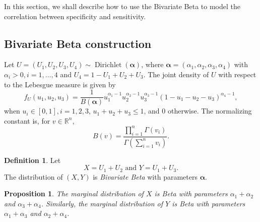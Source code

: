 \documentclass[a4paper, notitlepage, 11pt]{article}
\newcommand{\R}{\mathbb{R}}
\newtheorem{proposition}{Proposition}[]
\theoremstyle{definition}
\newtheorem{definition}{Definition}[section]
\theoremstyle{remark}
\begin{document}
In this section, we shall describe how to use the Bivariate Beta
\cite[]{olkin2015constructions} to model the correlation between specificity
and sensitivity.

\subsection{Bivariate Beta construction}

Let $U = (U_1, U_2, U_3, U_4) \sim
\operatorname{Dirichlet}(\boldsymbol{\alpha})$, where $\boldsymbol{\alpha} =
(\alpha_1, \alpha_2, \alpha_3, \alpha_4)$ with $\alpha_i > 0, i = 1,\dots,4$
and $U_4 = 1 - U_1 + U_2 + U_3$. The joint density of $U$ with respect to the
Lebesgue measure is given by
\begin{equation}
  f_U(u_1, u_2, u_3) = \frac{1}{B(\boldsymbol{\alpha})}u_1^{\alpha_1-1}u_2^{\alpha_2-1}u_3^{\alpha_3-1}(1-u_1-u_2-u_3)^{\alpha_4-1}, 
\end{equation}
when $u_i \in [0,1], i = 1,2,3$, $u_1 + u_2 + u_3 \le 1$, and $0$ otherwise.
The normalizing constant is, for $v \in \R^n$,
$$B(v) = \frac{\prod_{i=1}^n \Gamma(v_i)}{\Gamma\left(\sum_{i=1}^n v_i\right)}.$$ 

\begin{definition}
  Let 
  \begin{equation}
    X = U_1 + U_2 \text{ and } Y = U_1 + U_3.
  \end{equation} 
    The distribution of $(X,Y)$ is {\em Bivariate Beta} with parameters
    $\boldsymbol{\alpha}$. 
\end{definition}

\begin{proposition}
  The marginal distribution of $X$ is Beta with parameters $\alpha_1 +
  \alpha_2$ and $\alpha_3 + \alpha_4$. Similarly, the marginal distribution of
  $Y$ is Beta with parameters $\alpha_1 + \alpha_3$ and $\alpha_2 + \alpha_4$.
\end{proposition}
\end{document}
